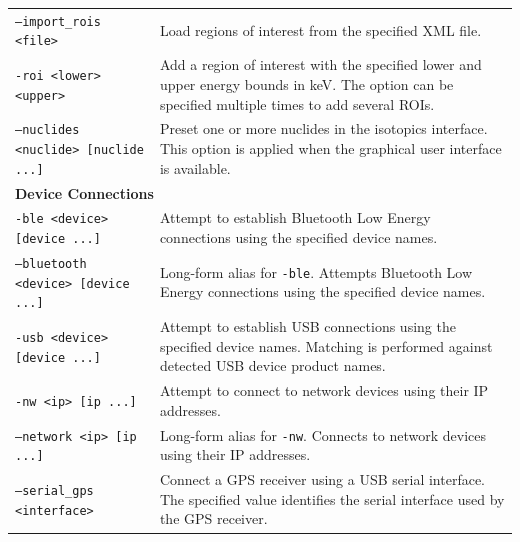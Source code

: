 \begin{longtable}{p{} p{}}
    \texttt{--import\_rois <file>} &
        Load regions of interest from the specified XML file. \\

    \texttt{-roi <lower> <upper>} &
        Add a region of interest with the specified lower and upper
        energy bounds in keV. The option can be specified multiple
        times to add several ROIs. \\

    \texttt{--nuclides <nuclide> [nuclide ...]} &
        Preset one or more nuclides in the isotopics interface.
        This option is applied when the graphical user interface is
        available. \\


    \multicolumn{2}{l}{\textbf{Device Connections}} \\

    \texttt{-ble <device> [device ...]} &
        Attempt to establish Bluetooth Low Energy connections using
        the specified device names. \\

    \texttt{--bluetooth <device> [device ...]} &
        Long-form alias for \texttt{-ble}. Attempts Bluetooth Low
        Energy connections using the specified device names. \\

    \texttt{-usb <device> [device ...]} &
        Attempt to establish USB connections using the specified
        device names. Matching is performed against detected USB
        device product names. \\

    \texttt{-nw <ip> [ip ...]} &
        Attempt to connect to network devices using their IP addresses. \\

    \texttt{--network <ip> [ip ...]} &
        Long-form alias for \texttt{-nw}. Connects to network devices
        using their IP addresses. \\

    \texttt{--serial\_gps <interface>} &
        Connect a GPS receiver using a USB serial interface. The
        specified value identifies the serial interface used by
        the GPS receiver. \\



\end{longtable}
